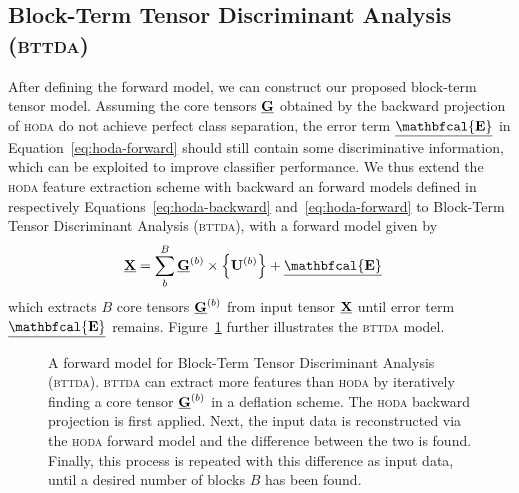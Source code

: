 \documentclass[twocolumn]{article}
\begin{document}
\subsection{Block-Term Tensor Discriminant Analysis (\textsc{bttda})}
After defining the forward model, we can construct our proposed block-term
tensor model. Assuming the core tensors $\underline{\mathbf{G}}$
obtained by the backward projection of \textsc{hoda} do not achieve perfect
class separation, the error term $\ten{\mathbfcal{E}}$ in
Equation~\ref{eq:hoda-forward} should still contain some discriminative
information, which can be exploited to improve classifier performance.
We thus extend the \textsc{hoda} feature extraction scheme with backward an
forward models defined in respectively Equations~\ref{eq:hoda-backward}
and~\ref{eq:hoda-forward} to Block-Term Tensor Discriminant Analysis
(\textsc{bttda}), with a forward model given by
\begin{align}
  \ten{X} & = \sum_b^B\ten{G}^{(b)}\mmpr{\mat{U}^{(b)}} + \ten{\mathbfcal{E}}
  \label{eq:bttda-forward}
\end{align}
which extracts $B$ core tensors $\underline{\mathbf{G}}^{(b)}$ from input tensor $\underline{\mathbf{X}}$
until error term $\ten{\mathbfcal{E}}$ remains.
Figure~\ref{fig:bttda} further illustrates the \textsc{bttda} model.
\begin{figure*}
	\centering
	
  \caption{A forward model for Block-Term Tensor Discriminant Analysis
  (\textsc{bttda}). \textsc{bttda} can extract more features
 than \textsc{hoda} by iteratively finding a core tensor $\underline{\mathbf{G}}^{(b)}$ in a
 deflation scheme.
 The \textsc{hoda} backward projection is first applied. Next, the
 input data is reconstructed via the \textsc{hoda} forward model and the
 difference between the two is found.
 Finally, this process is repeated with this difference as input data, until a
 desired number of blocks $B$ has been found.}
  \label{fig:bttda}
\end{figure*}
\end{document}
